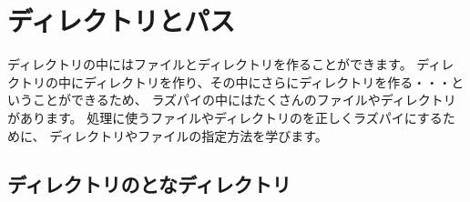 \documentclass[text03.tex]{subfiles}
\begin{document}
% 　

\section{ディレクトリとパス}
ディレクトリの中にはファイルとディレクトリを作ることができます。
ディレクトリの中にディレクトリを作り、その中にさらにディレクトリを作る・・・ということができるため、
ラズパイの中にはたくさんのファイルやディレクトリがあります。
処理に使うファイルやディレクトリのを正しくラズパイにするために、
ディレクトリやファイルの指定方法を学びます。

\subsection{ディレクトリのとなディレクトリ}
\end{document}
